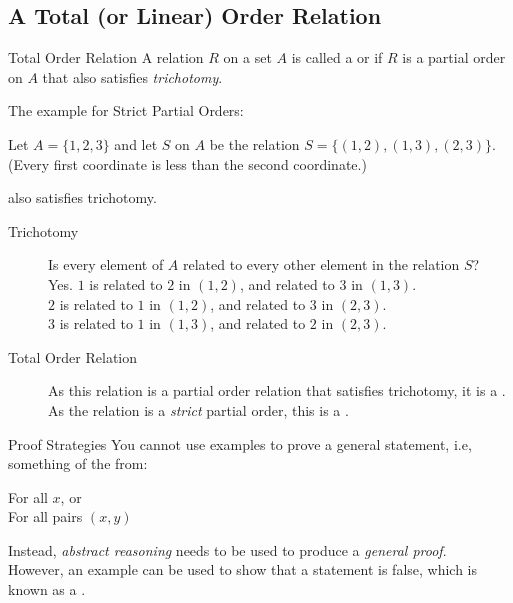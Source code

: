 \documentclass[../notes.tex]{subfiles}
\begin{document}
			\subsection{A Total (or Linear) Order Relation}
				\begin{definition}{Total Order Relation}
					A relation $R$ on a set $A$ is called a  or  if $R$ is a partial order on $A$ that also satisfies \emph{trichotomy}.
				\end{definition}
				\begin{example}
					The example for Strict Partial Orders:
					\begin{indentparagraph}
						Let $A = \{1, 2, 3\}$ and let $S$ on $A$ be the relation $S = \bigl\{(1, 2), (1, 3), (2, 3)\bigr\}$. (Every first coordinate is less than the second coordinate.)
					\end{indentparagraph}
					also satisfies trichotomy.
					\begin{description}
						\item[Trichotomy] Is every element of $A$ related to every other element in the relation $S$?\\
							Yes. $1$ is related to $2$ in $(1, 2)$, and related to $3$ in $(1, 3)$.\\
							$2$ is related to $1$ in $(1, 2)$, and related to $3$ in $(2, 3)$.\\
							$3$ is related to $1$ in $(1, 3)$, and related to $2$ in $(2, 3)$.
						\item[Total Order Relation] As this relation is a partial order relation that satisfies trichotomy, it is a . As the relation is a \emph{strict} partial order, this is a .
					\end{description}
				\end{example}
				\begin{sidenote}{Proof Strategies}
					You cannot use examples to prove a general statement, i.e, something of the from:
						\begin{indentparagraph}
							For all $x$, or\\
							For all pairs $(x, y)$
						\end{indentparagraph}
					Instead, \emph{abstract reasoning} needs to be used to produce a \emph{general proof}.\\
					However, an example can be used to show that a statement is false, which is known as a .
				\end{sidenote}
\end{document}
